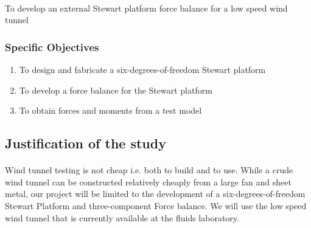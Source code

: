 \paragraph{} To develop an external Stewart platform force balance for a low speed wind tunnel 
\subsubsection{Specific Objectives}
\begin{enumerate}
\item To design and fabricate a six-degrees-of-freedom Stewart platform
\item To develop a force balance for the Stewart platform
\item To obtain forces and moments from a test model
\end{enumerate}
\subsection{Justification of the study}
\paragraph{}Wind tunnel testing is not cheap i.e. both to build and to use. While a crude wind tunnel can be constructed relatively cheaply from a large fan and sheet metal, our project will be limited to the development of a six-degrees-of-freedom Stewart Platform and three-component Force balance. We will use the low speed wind tunnel that is currently available at the fluids laboratory.
